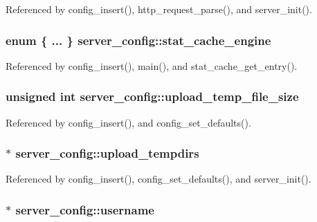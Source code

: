 Referenced by config\-\_\-insert(), http\-\_\-request\-\_\-parse(), and server\-\_\-init().

\hypertarget{structserver__config_a0aae802ab9165ae27bc9ad1a4f9fb11e}{
\subsubsection[{stat\-\_\-cache\-\_\-engine}]{\setlength{\rightskip}{0pt plus 5cm}enum \{ ... \}   server\-\_\-config\-::stat\-\_\-cache\-\_\-engine}}\label{structserver__config_a0aae802ab9165ae27bc9ad1a4f9fb11e}


Referenced by config\-\_\-insert(), main(), and stat\-\_\-cache\-\_\-get\-\_\-entry().

\hypertarget{structserver__config_afe8228f04feb3dc43c74509237dea66c}{
\subsubsection[{upload\-\_\-temp\-\_\-file\-\_\-size}]{\setlength{\rightskip}{0pt plus 5cm}unsigned int server\-\_\-config\-::upload\-\_\-temp\-\_\-file\-\_\-size}}\label{structserver__config_afe8228f04feb3dc43c74509237dea66c}


Referenced by config\-\_\-insert(), and config\-\_\-set\-\_\-defaults().

\hypertarget{structserver__config_a7c21ba7671f79f335b982afc3a1b6750}{
\subsubsection[{upload\-\_\-tempdirs}]{$\ast$ server\-\_\-config\-::upload\-\_\-tempdirs}}\label{structserver__config_a7c21ba7671f79f335b982afc3a1b6750}


Referenced by config\-\_\-insert(), config\-\_\-set\-\_\-defaults(), and server\-\_\-init().

\hypertarget{structserver__config_ad69c102b32ff59d24d6538b7f3fb35d2}{
\subsubsection[{username}]{$\ast$ server\-\_\-config\-::username}}\label{structserver__config_ad69c102b32ff59d24d6538b7f3fb35d2}


